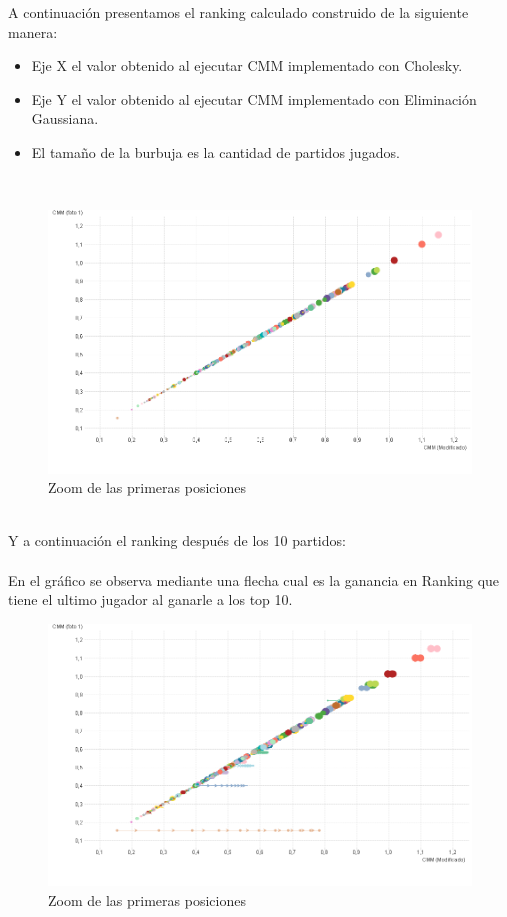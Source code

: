 A continuación presentamos el ranking calculado construido de la siguiente manera: \\

\begin{itemize}
	\item Eje X el valor obtenido al ejecutar CMM implementado con Cholesky.
	\item Eje Y el valor obtenido al ejecutar CMM implementado con Eliminación Gaussiana.
	\item El tamaño de la burbuja es la cantidad de partidos jugados.
\end{itemize}

\\

\begin{figure}[H]
\centering
\includegraphics[width=1\textwidth]{IMG/comparativa cmm -cmm foto 0.png}
\caption{Zoom de las primeras posiciones}
\label{fig:Zoom de las primeras posiciones}
\end{figure}

\\
Y a continuación el ranking después de los 10 partidos: \\
\\
En el gráfico se observa mediante una flecha cual es la ganancia en Ranking que tiene el ultimo jugador al ganarle a los top 10.\\

\begin{figure}[H]
\centering
\includegraphics[width=1\textwidth]{IMG/comparativa cmm -cmm foto 10.png}
\caption{Zoom de las primeras posiciones}
\label{fig:Zoom de las primeras posiciones}
\end{figure}


